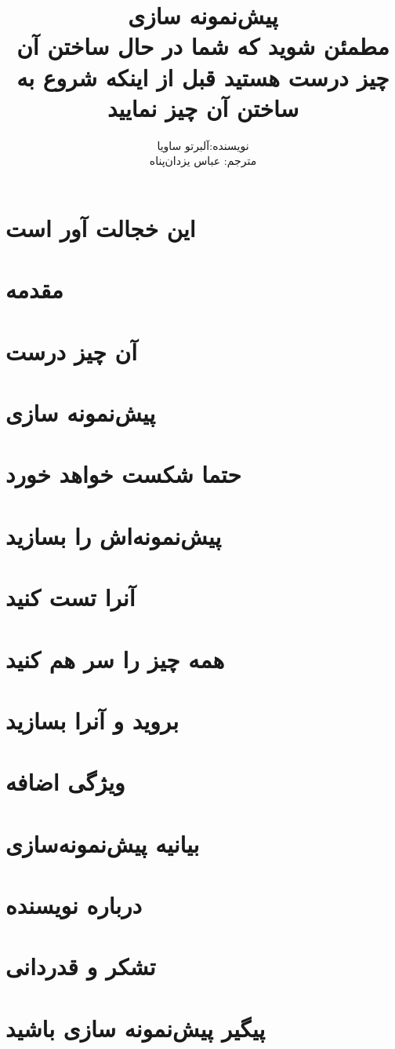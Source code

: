 \documentclass[a5paper,14pt]{book}
\author{نویسنده:آلبرتو ساویا
\\ مترجم: عباس یزدان‌پناه}
\title{پیش‌نمونه سازی
\\
مطمئن شوید که شما در حال ساختن  آن چیز درست هستید قبل از اینکه شروع به ساختن آن چیز نمایید}
\begin{document}
\maketitle
\frontmatter
\tableofcontents

\chapter{این خجالت آور است}

\chapter{مقدمه}

\mainmatter
\chapter{آن چیز درست}

\chapter{پیش‌نمونه سازی}

\chapter{حتما شکست خواهد خورد}

\chapter{پیش‌نمونه‌اش را بسازید}

\chapter{‌آنرا تست کنید}

\chapter{همه چیز را سر هم کنید}

\chapter{بروید و آنرا بسازید}

\chapter{ویژگی اضافه}

\chapter*{بیانیه پیش‌نمونه‌سازی}

\chapter*{درباره نویسنده}

\chapter*{تشکر و قدردانی}

\chapter*{پیگیر پیش‌نمونه سازی باشید}

\end{document}
